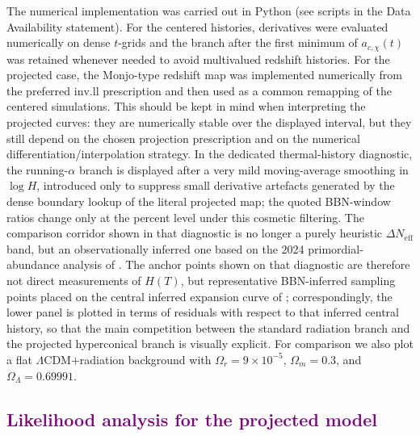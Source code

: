 \documentclass[11pt]{article}
\newcommand{\blue}[1]{{\color{blue}#1}}
\newcommand{\purple}[1]{\textcolor{purple}{#1}}
\begin{document}
\blue{The numerical implementation was carried out in Python (see scripts in the Data Availability statement). For the centered histories, derivatives were evaluated numerically on dense $t$-grids and the branch after the first minimum of $a_{c,\chi}(t)$ was retained whenever needed to avoid multivalued redshift histories. For the projected case, the Monjo-type redshift map was implemented numerically from the preferred $\mathrm{inv.ll}$ prescription and then used as a common remapping of the centered simulations. This should be kept in mind when interpreting the projected curves: they are numerically stable over the displayed interval, but they still depend on the chosen projection prescription and on the numerical differentiation/interpolation strategy. In the dedicated thermal-history diagnostic, the running-$\alpha$ branch is displayed after a very mild moving-average smoothing in $\log H$, introduced only to suppress small derivative artefacts generated by the dense boundary lookup of the literal projected map; the quoted BBN-window ratios change only at the percent level under this cosmetic filtering. The comparison corridor shown in that diagnostic is no longer a purely heuristic $\Delta N_{\mathrm{eff}}$ band, but an observationally inferred one based on the 2024 primordial-abundance analysis of \cite{schoneberg2024bbn}. The anchor points shown on that diagnostic are therefore not direct measurements of $H(T)$, but representative BBN-inferred sampling points placed on the central inferred expansion curve of \cite{schoneberg2024bbn}; correspondingly, the lower panel is plotted in terms of residuals with respect to that inferred central history, so that the main competition between the standard radiation branch and the projected hyperconical branch is visually explicit. For comparison we also plot a flat $\Lambda$CDM$+$radiation background with $\Omega_r=9\times10^{-5}$, $\Omega_m=0.3$, and $\Omega_\Lambda=0.69991$.}

\subsection{\purple{Likelihood analysis for the projected model}}
\end{document}
